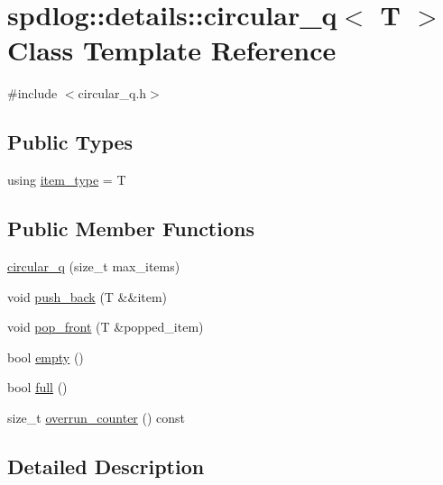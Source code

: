 \hypertarget{classspdlog_1_1details_1_1circular__q}{}\section{spdlog\+:\+:details\+:\+:circular\+\_\+q$<$ T $>$ Class Template Reference}
\label{classspdlog_1_1details_1_1circular__q}


{\ttfamily \#include $<$circular\+\_\+q.\+h$>$}

\subsection*{Public Types}
\begin{DoxyCompactItemize}
\item 
using \hyperlink{classspdlog_1_1details_1_1circular__q_a50926d98e20ee48b70d4b66d99895e97}{item\+\_\+type} = T
\end{DoxyCompactItemize}
\subsection*{Public Member Functions}
\begin{DoxyCompactItemize}
\item 
\hyperlink{classspdlog_1_1details_1_1circular__q_ab0aae072dd38824fee65ed9d48568c2f}{circular\+\_\+q} (size\+\_\+t max\+\_\+items)
\item 
void \hyperlink{classspdlog_1_1details_1_1circular__q_aaaab548bb6f5dd362458d6b044e0e950}{push\+\_\+back} (T \&\&item)
\item 
void \hyperlink{classspdlog_1_1details_1_1circular__q_a6e05a29447127eadabf01175a6b3ddc0}{pop\+\_\+front} (T \&popped\+\_\+item)
\item 
bool \hyperlink{classspdlog_1_1details_1_1circular__q_ae27eea7ecb58860f4471f473e02270f8}{empty} ()
\item 
bool \hyperlink{classspdlog_1_1details_1_1circular__q_a6f9e90a9957c230376a463b20f909191}{full} ()
\item 
size\+\_\+t \hyperlink{classspdlog_1_1details_1_1circular__q_a2f683dc45eca25efad9e415cf73c7ea0}{overrun\+\_\+counter} () const
\end{DoxyCompactItemize}


\subsection{Detailed Description}
